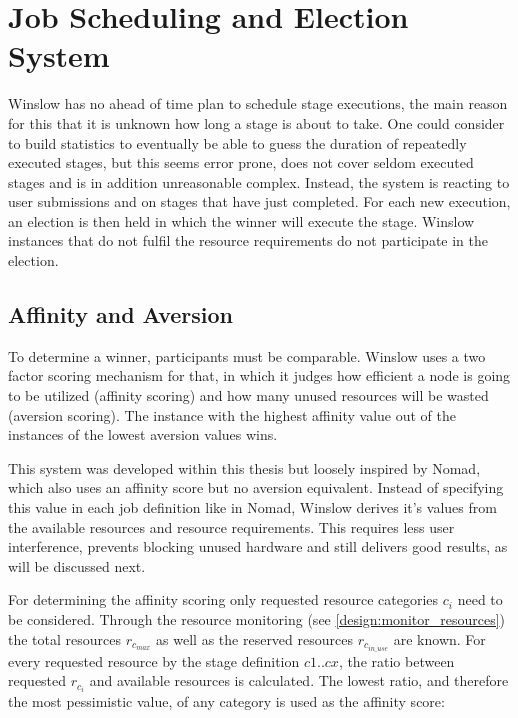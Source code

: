 


\section{Job Scheduling and Election System}
\label{design:election}

Winslow has no ahead of time plan to schedule stage executions, the main reason for this that it is unknown how long a stage is about to take.
One could consider to build statistics to eventually be able to guess the duration of repeatedly executed stages, but this seems error prone, does not cover seldom executed stages and is in addition unreasonable complex.
Instead, the system is reacting to user submissions and on stages that have just completed.
For each new execution, an election is then held in which the winner will execute the stage.
Winslow instances that do not fulfil the resource requirements do not participate in the election.

\subsection{Affinity and Aversion}
\label{election:affinity_and_aversion}

To determine a winner, participants must be comparable.
Winslow uses a two factor scoring mechanism for that, in which it judges how efficient a node is going to be utilized (affinity scoring) and how many unused resources will be wasted (aversion scoring).
The instance with the highest affinity value out of the instances of the lowest aversion values wins.

This system was developed within this thesis but loosely inspired by Nomad\cite{nomad:main}, which also uses an affinity score\cite{nomad:affinity} but no aversion equivalent.
Instead of specifying this value in each job definition like in Nomad, Winslow derives it's values from the available resources and resource requirements.
This requires less user interference, prevents blocking unused hardware and still delivers good results, as will be discussed next.

For determining the affinity scoring only requested resource categories $c_i$ need to be considered.
Through the resource monitoring (see \autoref{design:monitor_resources}) the total resources $r_{c_{max}}$ as well as the reserved resources $r_{c_{in\_use}}$ are known.
For every requested resource by the stage definition $c1 .. cx$, the ratio between requested $r_{c_i}$ and available resources is calculated.
The lowest ratio, and therefore the most pessimistic value, of any category is used as the affinity score:

